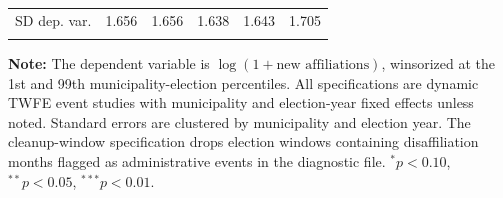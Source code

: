 \begin{table}[htbp]
\begin{tabular*}{\textwidth}{@{\extracolsep{\fill}}lccccc}
        SD dep. var. & 1.656 & 1.656 & 1.638 & 1.643 & 1.705 \\
        \doublebottomrule
    \end{tabular*}
    \vspace{1.1em}
    \begin{minipage}{\textwidth}
        {\footnotesize \textbf{Note:} The dependent variable is $\log(1+\text{new affiliations})$, winsorized at the 1st and 99th municipality-election percentiles. All specifications are dynamic TWFE event studies with municipality and election-year fixed effects unless noted. Standard errors are clustered by municipality and election year. The cleanup-window specification drops election windows containing disaffiliation months flagged as administrative events in the diagnostic file. $^{*} p<0.10$, $^{**} p<0.05$, $^{***} p<0.01$. \par}
    \end{minipage}
\end{table}
